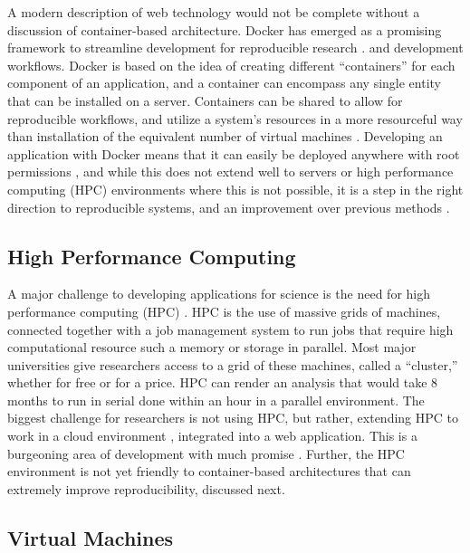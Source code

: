 \documentclass{report}
\begin{document}
A modern description of web technology would not be complete without a
discussion of container-based architecture. Docker \cite{noauthor_2015-vu} has
emerged as a promising framework to streamline development for
reproducible research \cite{Boettiger2014-cz}.
and development workflows. Docker is based on the idea of creating
different ``containers'' for each component of an application, and a
container can encompass any single entity that can be installed on a
server. Containers can be shared \cite{noauthor_undated-xe} to
allow for reproducible workflows, and utilize a system's resources in a
more resourceful way than installation of the equivalent number of
virtual machines \cite{Vaughan-Nichols2015-sg}.
Developing an application with Docker means that it can easily be
deployed anywhere with root permissions \cite{noauthor_undated-lf},
and while this does not extend well to servers or high performance
computing (HPC) environments where this is not possible, it is a step in
the right direction to reproducible systems, and an improvement over
previous methods \cite{noauthor_undated-im}.

\subsection{High Performance Computing}

A major challenge to developing applications for science is the need for
high performance computing (HPC) \cite{noauthor_undated-tu}.
HPC is the use of massive grids of machines, connected together with a
job management system \cite{noauthor_undated-qg,noauthor_undated-yd} to
run jobs that require high computational resource such a memory or
storage in parallel. Most major universities give researchers access to
a grid of these machines, called a ``cluster,'' whether for free or for
a price. HPC can render an analysis that would take 8 months to run in
serial done within an hour in a parallel environment. The biggest
challenge for researchers is not using HPC, but rather, extending HPC to
work in a cloud environment \cite{Eadline_undated-rs},
integrated into a web application. This is a burgeoning area of
development with much promise \cite{noauthor_undated-sd}.
Further, the HPC environment is not yet friendly to container-based
architectures that can extremely improve reproducibility, discussed
next.

\subsection{Virtual Machines}
\end{document}
